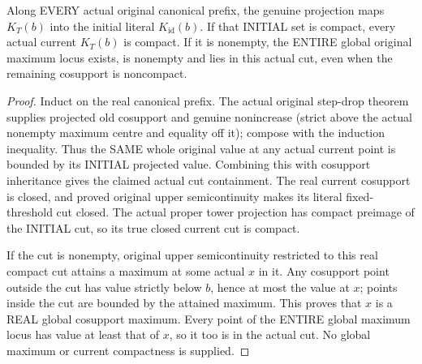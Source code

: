 \begin{lemma}
\label{hir:original-compact-upper-cut-current-compact}
\leanok
Along EVERY actual original canonical prefix, the genuine projection maps
$K_T(b)$ into the initial literal $K_{\mathrm{id}}(b)$. If that INITIAL set
is compact, every actual current $K_T(b)$ is compact. If it is nonempty,
the ENTIRE global original maximum locus exists, is nonempty and lies in
this actual cut, even when the remaining cosupport is noncompact.
\end{lemma}
\begin{proof}
Induct on the real canonical prefix. The actual original step-drop theorem
supplies projected old cosupport and genuine nonincrease (strict above the
actual nonempty maximum centre and equality off it); compose with the
induction inequality. Thus the SAME whole original value at any actual
current point is bounded by its INITIAL projected value. Combining this
with cosupport inheritance gives the claimed actual cut containment.
The real current cosupport is closed, and proved original upper
semicontinuity makes its literal fixed-threshold cut closed. The actual
proper tower projection has compact preimage of the INITIAL cut, so its
true closed current cut is compact.

If the cut is nonempty, original upper semicontinuity restricted to this
real compact cut attains a maximum at some actual $x$ in it. Any cosupport
point outside the cut has value strictly below $b$, hence at most the value
at $x$; points inside the cut are bounded by the attained maximum. This
proves that $x$ is a REAL global cosupport maximum. Every point of the
ENTIRE global maximum locus has value at least that of $x$, so it too is
in the actual cut. No global maximum or current compactness is supplied.
\end{proof}

